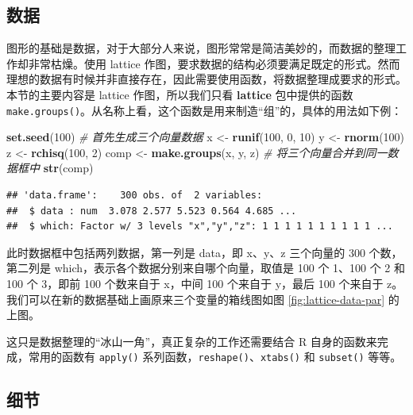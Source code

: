 \documentclass[
  b5paper,
  UTF8,twoside]{book}
\newenvironment{Shaded}{\begin{snugshade}}{\end{snugshade}}
\newcommand{\CommentTok}[1]{\textcolor[rgb]{0.56,0.35,0.01}{\textit{#1}}}
\newcommand{\DecValTok}[1]{\textcolor[rgb]{0.00,0.00,0.81}{#1}}
\newcommand{\FunctionTok}[1]{\textcolor[rgb]{0.13,0.29,0.53}{\textbf{#1}}}
\newcommand{\NormalTok}[1]{#1}
\newcommand{\OtherTok}[1]{\textcolor[rgb]{0.56,0.35,0.01}{#1}}
\begin{document}
\subsection{数据}\label{ux6570ux636e}

图形的基础是数据，对于大部分人来说，图形常常是简洁美妙的，而数据的整理工作却非常枯燥。使用 lattice 作图，要求数据的结构必须要满足既定的形式。然而理想的数据有时候并非直接存在，因此需要使用函数，将数据整理成要求的形式。本节的主要内容是 lattice 作图，所以我们只看 \textbf{lattice} 包中提供的函数 \texttt{make.groups()}。从名称上看，这个函数是用来制造``组''的，具体的用法如下例：

\begin{Shaded}
\begin{Highlighting}[]
\FunctionTok{set.seed}\NormalTok{(}\DecValTok{100}\NormalTok{) }\CommentTok{\# 首先生成三个向量数据}
\NormalTok{x }\OtherTok{\textless{}{-}} \FunctionTok{runif}\NormalTok{(}\DecValTok{100}\NormalTok{, }\DecValTok{0}\NormalTok{, }\DecValTok{10}\NormalTok{)}
\NormalTok{y }\OtherTok{\textless{}{-}} \FunctionTok{rnorm}\NormalTok{(}\DecValTok{100}\NormalTok{)}
\NormalTok{z }\OtherTok{\textless{}{-}} \FunctionTok{rchisq}\NormalTok{(}\DecValTok{100}\NormalTok{, }\DecValTok{2}\NormalTok{)}
\NormalTok{comp }\OtherTok{\textless{}{-}} \FunctionTok{make.groups}\NormalTok{(x, y, z) }\CommentTok{\# 将三个向量合并到同一数据框中}
\FunctionTok{str}\NormalTok{(comp)}
\end{Highlighting}
\end{Shaded}

\begin{verbatim}
## 'data.frame':    300 obs. of  2 variables:
##  $ data : num  3.078 2.577 5.523 0.564 4.685 ...
##  $ which: Factor w/ 3 levels "x","y","z": 1 1 1 1 1 1 1 1 1 1 ...
\end{verbatim}

此时数据框中包括两列数据，第一列是 data，即 x、y、z 三个向量的 300 个数，第二列是 which，表示各个数据分别来自哪个向量，取值是 100 个 1、100 个 2 和 100 个 3，即前 100 个数来自于 x，中间 100 个来自于 y，最后 100 个来自于 z。我们可以在新的数据基础上画原来三个变量的箱线图如图 \ref{fig:lattice-data-par} 的上图。

这只是数据整理的``冰山一角''，真正复杂的工作还需要结合 R 自身的函数来完成，常用的函数有 \texttt{apply()} 系列函数，\texttt{reshape()}、\texttt{xtabs()} 和 \texttt{subset()} 等等。

\subsection{细节}\label{ux7ec6ux8282}
\end{document}
